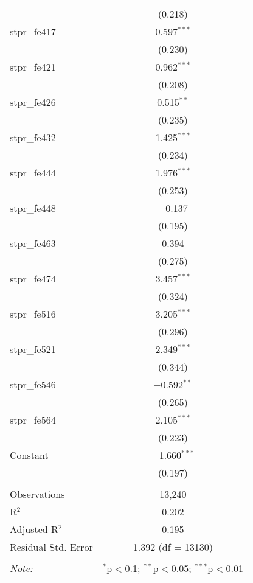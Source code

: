 \begin{table}[!htbp]
\begin{tabular}{@{\extracolsep{5pt}}lc}
  & (0.218) \\ 
  stpr\_fe417 & 0.597$^{***}$ \\ 
  & (0.230) \\ 
  stpr\_fe421 & 0.962$^{***}$ \\ 
  & (0.208) \\ 
  stpr\_fe426 & 0.515$^{**}$ \\ 
  & (0.235) \\ 
  stpr\_fe432 & 1.425$^{***}$ \\ 
  & (0.234) \\ 
  stpr\_fe444 & 1.976$^{***}$ \\ 
  & (0.253) \\ 
  stpr\_fe448 & $-$0.137 \\ 
  & (0.195) \\ 
  stpr\_fe463 & 0.394 \\ 
  & (0.275) \\ 
  stpr\_fe474 & 3.457$^{***}$ \\ 
  & (0.324) \\ 
  stpr\_fe516 & 3.205$^{***}$ \\ 
  & (0.296) \\ 
  stpr\_fe521 & 2.349$^{***}$ \\ 
  & (0.344) \\ 
  stpr\_fe546 & $-$0.592$^{**}$ \\ 
  & (0.265) \\ 
  stpr\_fe564 & 2.105$^{***}$ \\ 
  & (0.223) \\ 
  Constant & $-$1.660$^{***}$ \\ 
  & (0.197) \\ 
 \hline \\[-1.8ex] 
Observations & 13,240 \\ 
R$^{2}$ & 0.202 \\ 
Adjusted R$^{2}$ & 0.195 \\ 
Residual Std. Error & 1.392 (df = 13130) \\ 
\hline 
\hline \\[-1.8ex] 
\textit{Note:}  & \multicolumn{1}{r}{$^{*}$p$<$0.1; $^{**}$p$<$0.05; $^{***}$p$<$0.01} \\ 
\end{tabular} 
\end{table} 
